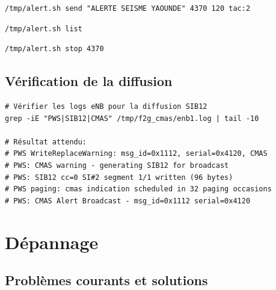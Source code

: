\documentclass[11pt,a4paper]{article}
\begin{document}
\begin{cmdbox}
\begin{lstlisting}[style=bashstyle]
/tmp/alert.sh send "ALERTE SEISME YAOUNDE" 4370 120 tac:2
\end{lstlisting}
\end{cmdbox}

\begin{cmdbox}
\begin{lstlisting}[style=bashstyle]
/tmp/alert.sh list
\end{lstlisting}
\end{cmdbox}

\begin{cmdbox}
\begin{lstlisting}[style=bashstyle]
/tmp/alert.sh stop 4370
\end{lstlisting}
\end{cmdbox}

\subsection{Vérification de la diffusion}

\begin{successbox}
\begin{lstlisting}[style=bashstyle]
# Vérifier les logs eNB pour la diffusion SIB12
grep -iE "PWS|SIB12|CMAS" /tmp/f2g_cmas/enb1.log | tail -10

# Résultat attendu:
# PWS WriteReplaceWarning: msg_id=0x1112, serial=0x4120, CMAS
# PWS: CMAS warning - generating SIB12 for broadcast
# PWS: SIB12 cc=0 SI#2 segment 1/1 written (96 bytes)
# PWS paging: cmas indication scheduled in 32 paging occasions
# PWS: CMAS Alert Broadcast - msg_id=0x1112 serial=0x4120
\end{lstlisting}
\end{successbox}

\newpage

\section{Dépannage}

\subsection{Problèmes courants et solutions}
\end{document}

